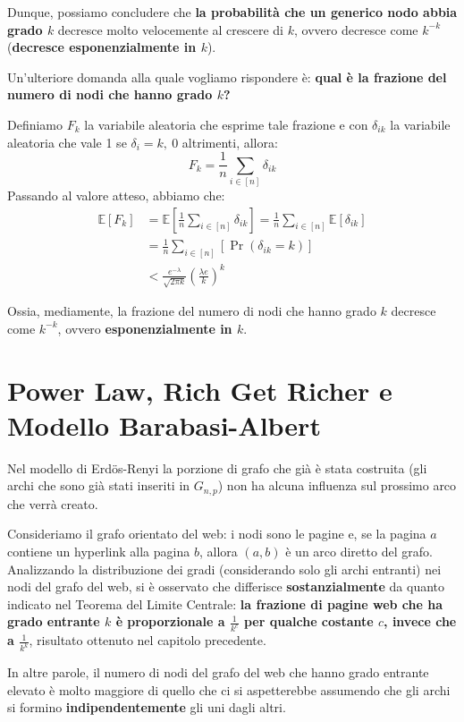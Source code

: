  Dunque, possiamo concludere che \textbf{la probabilità che un generico nodo abbia grado $k$} decresce molto velocemente al crescere di $k$, ovvero decresce come $k^{-k}$ (\textbf{decresce esponenzialmente in $k$}).

\newpage

Un'ulteriore domanda alla quale vogliamo rispondere è: \textbf{qual è la frazione del numero di nodi che hanno grado $k$?}

Definiamo $F_k$ la variabile aleatoria che esprime tale frazione e con $\delta_{ik}$ la variabile aleatoria che vale 1 se $\delta_i = k,\ 0$ altrimenti, allora:
\[
F_k = \frac{1}{n}\sum_{i \in [n]} \delta_{ik}
\]
Passando al valore atteso, abbiamo che:
\begin{align*}
    \mathbb{E}[F_k] &= \mathbb{E}\left[\frac{1}{n}\sum_{i \in [n]} \delta_{ik}\right] = \frac{1}{n}\sum_{i \in [n]} \mathbb{E}[\delta_{ik}] \\
    &= \frac{1}{n}\sum_{i \in [n]}[\Pr(\delta_{ik} = k)] \\
    &< \frac{e^{-\lambda}}{\sqrt{2\pi k}} \left(\frac{\lambda e}{k}\right)^k
\end{align*}

 Ossia, mediamente, la frazione del numero di nodi che hanno grado $k$ decresce come $k^{-k}$, ovvero \textbf{esponenzialmente in $k$}.

\newpage 

\section{Power Law, Rich Get Richer e Modello Barabasi-Albert}

Nel modello di Erd\"os-Renyi la porzione di grafo che già è stata costruita (gli archi che sono già stati inseriti in $G_{n,p}$) non ha alcuna influenza sul prossimo arco che verrà creato.

Consideriamo il grafo orientato del web: i nodi sono le pagine e, se la pagina $a$ contiene un hyperlink alla pagina $b$, allora $(a,b)$ è un arco diretto del grafo. Analizzando la distribuzione dei gradi (considerando solo gli archi entranti) nei nodi del grafo del web, si è osservato che differisce \textbf{sostanzialmente} da quanto indicato nel Teorema del Limite Centrale: \textbf{la frazione di pagine web che ha grado entrante $k$ è proporzionale a $\frac{1}{k^c}$ per qualche costante $c$, invece che a $\frac{1}{k^k}$}, risultato ottenuto nel capitolo precedente.

In altre parole, il numero di nodi del grafo del web che hanno grado entrante elevato è molto maggiore di quello che ci si aspetterebbe assumendo che gli archi si formino \textbf{indipendentemente} gli uni dagli altri.

